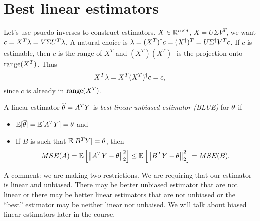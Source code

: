 \section{Best linear estimators}
Let's use psuedo inverses to construct estimators. $X \in {\mathbb R}^{n \times d}$, $X = U\Sigma V^T$, we want $c = X^T \lambda = V\Sigma U^T \lambda$. A natural choice is $\lambda = (X^T)^\dagger c=(X^\dagger)^T = U\Sigma^\dagger V^T c$. If $c$ is estimable, then $c$ is the range of $X^T$ and $(X^T)(X^T)^\dagger$ is the projection onto $\operatorname{range}(X^T)$. Thus 
\[X^T\lambda = X^T(X^T)^\dagger c = c, \]
since $c$ is already in $\operatorname{range}(X^T)$.
\begin{defn}
    A linear estimator $\widehat{{\theta}} = A^T Y$ is \emph{best linear unbiased estimator (BLUE)} for ${\theta}$ if
    \begin{itemize}
        \item ${\mathbb{E}}[\widehat{{\theta}}]={\mathbb{E}}[A^TY]={\theta}$ and
        \item If $B$ is such that ${\mathbb{E}}[B^T Y] = {\theta}$, then 
        \[MSE(A) = {\mathbb{E}}\left[\left\|A^TY-{\theta}\right\|_2^2\right] \le {\mathbb{E}}\left[\left\|B^TY - {\theta}\right\|_2^2\right] =MSE(B). \]
    \end{itemize}  
\end{defn}
A comment: we are making two restrictions. We are requiring that our estimator is linear and unbiased. There may be better unbiased estimator that are not linear or there may be better linear estimators that are not unbiased or the ``best'' estimator may be neither linear nor unbaised. We will talk about biased linear estimators later in the course.

